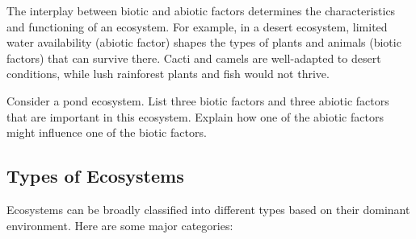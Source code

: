 The interplay between biotic and abiotic factors determines the characteristics and functioning of an ecosystem.  For example, in a desert ecosystem, limited water availability (abiotic factor) shapes the types of plants and animals (biotic factors) that can survive there. Cacti and camels are well-adapted to desert conditions, while lush rainforest plants and fish would not thrive.

\begin{stopandthink}
Consider a pond ecosystem. List three biotic factors and three abiotic factors that are important in this ecosystem. Explain how one of the abiotic factors might influence one of the biotic factors.
\end{stopandthink}

\subsection{Types of Ecosystems}

Ecosystems can be broadly classified into different types based on their dominant environment.  Here are some major categories:

